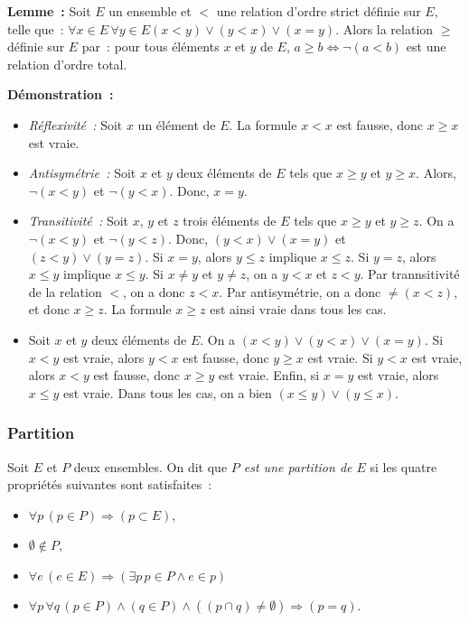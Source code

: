 \done

\medskip

\noindent\textbf{Lemme :} Soit $E$ un ensemble et $<$ une relation d'ordre strict définie sur $E$, telle que : $\forall x \in E \, \forall y \in E (x < y) \vee (y < x) \vee (x = y)$. 
    Alors la relation $\geq$ définie sur $E$ par : pour tous éléments $x$ et $y$ de $E$, $a \geq b \Leftrightarrow \neg (a < b)$ est une relation d'ordre total. 

\medskip

\noindent\textbf{Démonstration :} 
\begin{itemize}[nosep]
    \item \textit{Réflexivité :} Soit $x$ un élément de $E$. 
        La formule $x < x$ est fausse, donc $x \geq x$ est vraie. 
    \item \textit{Antisymétrie :} Soit $x$ et $y$ deux éléments de $E$ tels que $x \geq y$ et $y \geq x$. 
        Alors, $\neg (x < y)$ et $\neg (y < x)$. 
        Donc, $x = y$.
    \item \textit{Transitivité :} Soit $x$, $y$ et $z$ trois éléments de $E$ tels que $x \geq y$ et $y \geq z$. 
        On a $\neg (x < y)$ et $\neg (y < z)$. 
        Donc, $(y < x) \vee (x = y)$ et $(z < y) \vee (y = z)$. 
        Si $x = y$, alors $y \leq z$ implique $x \leq z$.
        Si $y = z$, alors $x \leq y$ implique $x \leq y$.
        Si $x \neq y$ et $y \neq z$, on a $y < x$ et $z < y$. 
        Par trannsitivité de la relation $<$, on a donc $z < x$. 
        Par antisymétrie, on a donc $\neq (x < z)$, et donc $x \geq z$. 
        La formule $x \geq z$ est ainsi vraie dans tous les cas. 
    \item Soit $x$ et $y$ deux éléments de $E$. 
        On a $(x < y) \vee (y < x) \vee (x = y)$. 
        Si $x < y$ est vraie, alors $y < x$ est fausse, donc $y \geq x$ est vraie.
        Si $y < x$ est vraie, alors $x < y$ est fausse, donc $x \geq y$ est vraie.
        Enfin, si $x = y$ est vraie, alors $x \leq y$ est vraie. 
        Dans tous les cas, on a bien $(x \leq y) \vee (y \leq x)$.
\end{itemize}

\subsubsection{Partition} 

Soit $E$ et $P$ deux ensembles. 
On dit que \textit{$P$ est une partition de $E$} si les quatre propriétés suivantes sont satisfaites : 
\begin{itemize}[nosep]
    \item $\forall p \, (p \in P) \Rightarrow (p \subset E)$, 
    \item $\emptyset \notin P$, 
    \item $\forall e \, (e \in E) \Rightarrow (\exists p \, p \in P \wedge e \in p)$
    \item $\forall p \, \forall q \, (p \in P) \wedge (q \in P) \wedge ((p \cap q) \neq \emptyset) \Rightarrow (p = q)$. 
\end{itemize}


